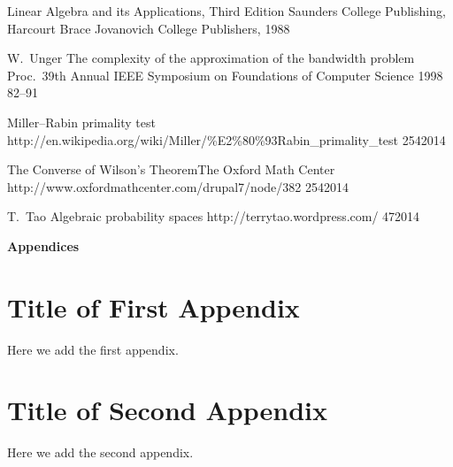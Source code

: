\documentclass[12pt,a4paper,titlepage,openany]{report}
\begin{document}
\begin{thebibliography}{99}
   {Linear Algebra and its Applications, Third Edition}
    {Saunders College \hbox{Publishing}, Harcourt Brace Jovanovich College Publishers, 1988}

\conferenceArticleOneAuthor
    {W.~Unger}
    {The complexity of the approximation of the bandwidth problem}
    {Proc.~39th Annual IEEE Symposium on Foundations of Computer Science}
    {1998}
    {82--91}

\webPageNoAuthor
    {Miller--Rabin primality test}
    {\newline http://en.wikipedia.org/wiki/Miller/\%E2\%80\%93Rabin\_primality\_test}
    {25}{4}{2014}

\webPageNoAuthorWithInstitution
    {The Converse of Wilson's Theorem}{The Oxford Math Center}
    {http://www.oxfordmathcenter.com/drupal7/node/382}
    {25}{4}{2014}

\webPageOneAuthor
    {T.~Tao}
    {Algebraic probability spaces}
    {http://terrytao.wordpress.com/}
    {4}{7}{2014}

\end{thebibliography}
\newpage


\pagestyle{fancyplain}
\vspace*{\fill}
     \begin{center}
          \bf{\Huge{Appendices}}
     \end{center}
\vspace*{\fill}
\thispagestyle{fancy}

\appendix
\thispagestyle{empty}

\chapter{Title of First Appendix}
\thispagestyle{empty}
Here we add the first appendix.


\chapter{Title of Second Appendix}
\thispagestyle{empty}
Here we add the second appendix.


\end{document}
